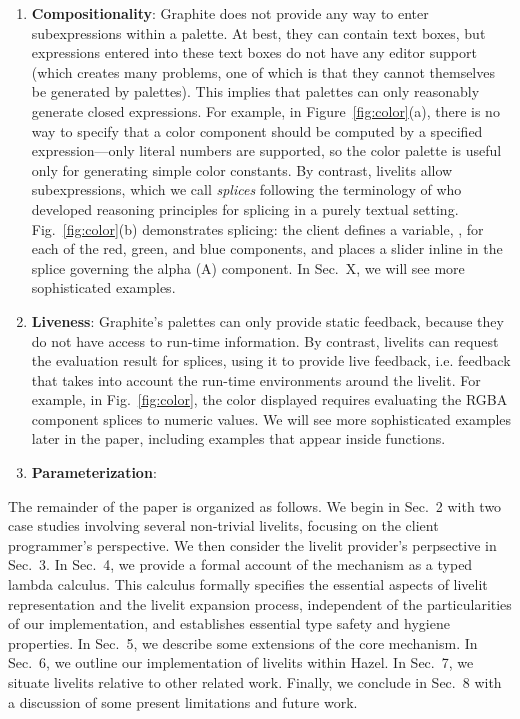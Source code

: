 \begin{enumerate}
  \item \textbf{Compositionality}: 
  Graphite does not provide any way to {enter subexpressions within a palette}.
  At best, they can contain text boxes, but expressions entered into these text boxes 
  do not have any editor support (which creates many problems, one of which is that they cannot themselves be generated by palettes). 
  This implies that palettes can only reasonably generate {closed expressions}. 
  For example, in Figure~\ref{fig:color}(a), there is no way to specify that a color component 
  should be computed by a specified expression---only literal numbers are supported, so the color palette
  is useful only for generating simple color constants.
  By contrast, livelits allow subexpressions, which we call \emph{splices} following
  the terminology of \citet{TLMs} who developed reasoning principles for splicing in a purely textual setting.
  Fig.~\ref{fig:color}(b) demonstrates splicing: the client defines a variable, , 
  for each of the red, green, and blue components, and places a slider inline in the splice governing 
  the alpha (A) component. In Sec.~X, we will see more sophisticated examples.
  \item \textbf{Liveness}: Graphite's palettes can only provide static feedback, because they do not have 
  access to run-time information. By contrast, livelits can request the evaluation result for splices,
  using it to provide live feedback, i.e. feedback that takes into account the run-time environments 
  around the livelit. For example, in Fig.~\ref{fig:color}, the color displayed requires evaluating the RGBA 
  component splices to numeric values. We will see more sophisticated examples later in the paper, including examples
  that appear inside functions.
  \item \textbf{Parameterization}: 
\end{enumerate}
\clearpage

The remainder of the paper is organized as follows. We begin in Sec.~2 with two case studies 
involving several non-trivial livelits, focusing on the client programmer's perspective. 
We then consider the livelit provider's perpsective in Sec.~3.
In Sec.~4, we provide a formal account of the mechanism as a typed lambda calculus. 
This calculus formally specifies the essential aspects of livelit representation and 
the livelit expansion process, independent of the particularities of our implementation, 
and establishes essential type safety and hygiene properties. 
In Sec.~5, we describe some extensions of the core mechanism.
In Sec.~6, we outline our implementation of livelits within Hazel.
In Sec.~7, we situate livelits relative to other related work. 
Finally, we conclude in Sec.~8 with a discussion of some present limitations and future work.

